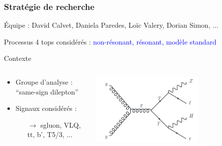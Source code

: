 \begin{frame}
\frametitle{Stratégie de recherche}
\begin{small}
\begin{maliste}
\item \'Equipe : David Calvet, Daniela Paredes, Lo\"ic Valery, Dorian Simon, ...
\vspace*{0.1cm}
\item Processus 4 tops considérés : \textcolor{blue}{non-r\'esonant, r\'esonant, mod\`ele standard}
\end{maliste}
\end{small}

\begin{varblock}[11cm]{Contexte}
\begin{columns}
\begin{column}{0.6\textwidth}
\begin{itemize}
\item Groupe d'analyse : ``same-sign dilepton''
\item Signaux considérés : 
\begin{itemize}
\item[$\rightarrow$] sgluon, VLQ, tt, b', T5/3, ...
\end{itemize}
\end{itemize}
\end{column}
\begin{column}{0.4\textwidth}
\includegraphics[width=0.65\textwidth]{Figures/FourTops/VLQ_feynDiag.png}

\end{column}
\end{columns}
\end{varblock}


\end{frame}

